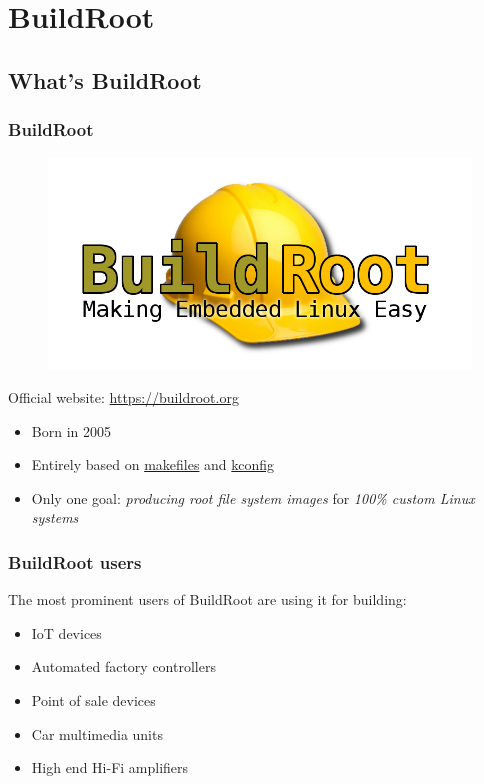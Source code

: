 \section{BuildRoot}
\subsection{What's BuildRoot}
\begin{frame}
  \frametitle{BuildRoot}
  \begin{figure}
    \begin{center}
      \includegraphics[width=.5\textwidth]{logo-buildroot}
    \end{center}
  \end{figure}
  \begin{center}
    Official website: \url{https://buildroot.org}
  \end{center}
  \begin{itemize}
    \item<1-> Born in 2005
    \item<2-> Entirely based on \href{https://en.wikipedia.org/wiki/Make_(software)}{makefiles} and \href{https://www.kernel.org/doc/html/latest/kbuild/kconfig-language.html}{kconfig}
    \item<3-> Only one goal: \textit{producing root file system images} for \textit{100\% custom Linux systems}
  \end{itemize}
\end{frame}
\begin{frame}
  \frametitle{BuildRoot users}
  The most prominent users of BuildRoot are using it for building:
  \begin{itemize}
    \item<1-> IoT devices
    \item<2-> Automated factory controllers
    \item<3-> Point of sale devices
    \item<4-> Car multimedia units
    \item<5-> High end Hi-Fi amplifiers
  \end{itemize}
\end{frame}
